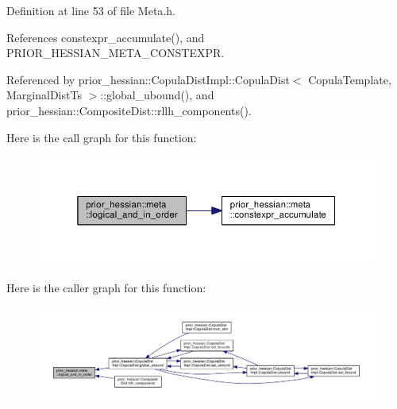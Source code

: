 Definition at line 53 of file Meta.\+h.



References constexpr\+\_\+accumulate(), and P\+R\+I\+O\+R\+\_\+\+H\+E\+S\+S\+I\+A\+N\+\_\+\+M\+E\+T\+A\+\_\+\+C\+O\+N\+S\+T\+E\+X\+PR.



Referenced by prior\+\_\+hessian\+::\+Copula\+Dist\+Impl\+::\+Copula\+Dist$<$ Copula\+Template, Marginal\+Dist\+Ts $>$\+::global\+\_\+ubound(), and prior\+\_\+hessian\+::\+Composite\+Dist\+::rllh\+\_\+components().



Here is the call graph for this function\+:\nopagebreak
\begin{figure}[H]
\begin{center}
\leavevmode
\includegraphics[width=338pt]{namespaceprior__hessian_1_1meta_add11951e7edc2c231ca52c32ac0ee07b_cgraph}
\end{center}
\end{figure}




Here is the caller graph for this function\+:\nopagebreak
\begin{figure}[H]
\begin{center}
\leavevmode
\includegraphics[width=350pt]{namespaceprior__hessian_1_1meta_add11951e7edc2c231ca52c32ac0ee07b_icgraph}
\end{center}
\end{figure}


